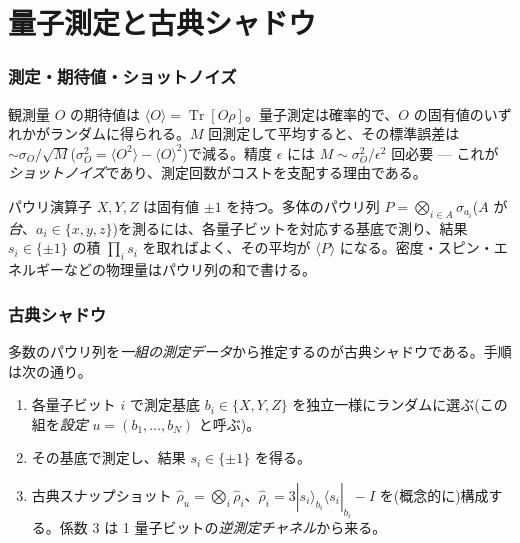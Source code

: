 \documentclass[11pt,a4paper]{ltjsarticle}
\newcommand{\bra}[1]{\langle #1|}
\newcommand{\ket}[1]{|#1\rangle}
\newcommand{\ev}[1]{\langle #1\rangle}
\newcommand{\Tr}{\operatorname{Tr}}
\begin{document}
\part{量子測定と古典シャドウ}
\label{part:meas}

\section{測定・期待値・ショットノイズ}

観測量 $O$ の期待値は $\ev{O}=\Tr[O\rho]$。量子測定は確率的で、$O$ の固有値のいずれかがランダムに得られる。$M$ 回測定して平均すると、その標準誤差は $\sim\sigma_O/\sqrt{M}$($\sigma_O^2=\ev{O^2}-\ev{O}^2$)で減る。精度 $\epsilon$ には $M\sim\sigma_O^2/\epsilon^2$ 回必要 — これが\emph{ショットノイズ}であり、測定回数がコストを支配する理由である。

パウリ演算子 $X,Y,Z$ は固有値 $\pm1$ を持つ。多体のパウリ列 $P=\bigotimes_{i\in A}\sigma_{a_i}$($A$ が\emph{台}、$a_i\in\{x,y,z\}$)を測るには、各量子ビットを対応する基底で測り、結果 $s_i\in\{\pm1\}$ の積 $\prod_i s_i$ を取ればよく、その平均が $\ev{P}$ になる。密度・スピン・エネルギーなどの物理量はパウリ列の和で書ける。

\section{古典シャドウ}
\label{sec:shadow-t}

多数のパウリ列を\emph{一組の測定データ}から推定するのが古典シャドウである。手順は次の通り。
\begin{enumerate}
  \item 各量子ビット $i$ で測定基底 $b_i\in\{X,Y,Z\}$ を独立一様にランダムに選ぶ(この組を\emph{設定} $u=(b_1,\dots,b_N)$ と呼ぶ)。
  \item その基底で測定し、結果 $s_i\in\{\pm1\}$ を得る。
  \item 古典スナップショット $\hat\rho_u = \bigotimes_i \hat\rho_i$、$\hat\rho_i = 3\ket{s_i}_{b_i}\!\bra{s_i}_{b_i} - I$ を(概念的に)構成する。係数 $3$ は 1 量子ビットの\emph{逆測定チャネル}から来る。
\end{enumerate}
\end{document}
